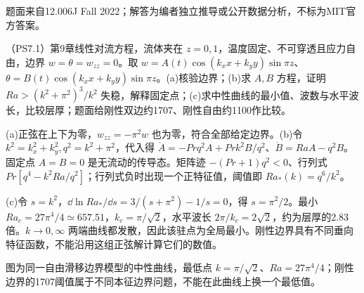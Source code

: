 题面来自12.006J Fall 2022；解答为编者独立推导或公开数据分析，不标为MIT官方答案。
\begin{exercise}
（PS7.1）第9章线性对流方程，流体夹在 $z=0,1$，温度固定、不可穿透且应力自由，边界 $w=\theta=w_{zz}=0$。取 $w=A(t)\cos(k_xx+k_yy)\sin\pi z$、$\theta=B(t)\cos(k_xx+k_yy)\sin\pi z$。(a)核验边界；(b)求 $A,B$ 方程，证明 $Ra>(k^2+\pi^2)^3/k^2$ 失稳，解释固定点；(c)求中性曲线的最小值、波数与水平波长，比较层厚；题面给刚性双边约1707、刚性自由约1100作比较。
\end{exercise}
\begin{solution}
(a)正弦在上下为零，$w_{zz}=-\pi^2w$ 也为零，符合全部给定边界。(b)令 $k^2=k_x^2+k_y^2,q^2=k^2+\pi^2$，代入得 $\dot A=-Prq^2A+Prk^2B/q^2$、$\dot B=Ra A-q^2B$。固定点 $A=B=0$ 是无流动的传导态。矩阵迹 $-(Pr+1)q^2<0$、行列式 $Pr[q^4-k^2Ra/q^2]$；行列式负时出现一个正特征值，阈值即 $Ra_*(k)=q^6/k^2$。

(c)令 $s=k^2$，$\dd\ln Ra_*/\dd s=3/(s+\pi^2)-1/s=0$，得 $s=\pi^2/2$。最小 $Ra_c=27\pi^4/4\simeq657.51$，$k_c=\pi/\sqrt2$，水平波长 $2\pi/k_c=2\sqrt2$，约为层厚的2.83倍。$k\to0,\infty$ 两端曲线都发散，因此该驻点为全局最小。刚性边界具有不同垂向特征函数，不能沿用这组正弦解计算它们的数值。
\begin{center}\end{center}
图为同一自由滑移边界模型的中性曲线，最低点 $k=\pi/\sqrt2$、$Ra=27\pi^4/4$；刚性边界的1707阈值属于不同本征边界问题，不能在此曲线上换一个最低值。
\end{solution}

